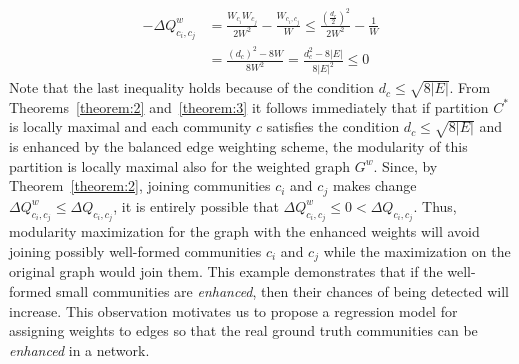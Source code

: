 \begin{align}
- \Delta Q^w_{c_i,c_j} &=  \frac{W_{c_i}W_{c_j}}{2W^2} - \frac{W_{c_i, c_j}}{W}\leq \frac{(\frac{d_c}{2})^2}{2W^2} - \frac{1}{W}\\
&= \frac{(d_c)^2 - 8 W }{8W^2} = \frac{d_c^2 - 8 |E| }{8|E|^2}\leq 0
\end{align}
Note that the last inequality holds because of the condition $d_c\leq \sqrt{8|E|}$.
From Theorems~\ref{theorem:2} and~\ref{theorem:3} it follows immediately that if partition $C^*$ is locally maximal and each community $c$ satisfies
the condition $d_c \leq \sqrt{8|E|}$ and is enhanced by the balanced edge weighting scheme, the modularity of this partition is locally maximal also for the weighted graph $G^w$.
Since, by Theorem~\ref{theorem:2}, joining communities $c_i$ and $c_j$ makes change $\Delta Q^w_{c_i,c_j}\leq \Delta Q_{c_i,c_j}$, it is entirely possible that $\Delta Q^w_{c_i,c_j}\leq 0 <\Delta Q_{c_i,c_j}$. Thus, modularity maximization for the graph with the enhanced weights will avoid joining possibly well-formed communities $c_i$ and $c_j$ while the maximization on the original graph would join them. This example demonstrates that if the well-formed small communities are \textit{enhanced}, then their chances of being detected will increase. This observation motivates us to propose a regression model for assigning weights to edges so that the real ground truth communities can be \textit{enhanced} in a network.
